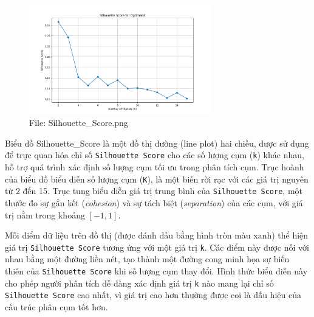 \documentclass[12pt]{report}
\begin{document}
{\\
\begin{figure}[h]
    \centering
    \includegraphics[width=300px]{Silhouette_Score.png}
    \caption{File: Silhouette\_Score.png}
    \label{fig:Silhouette}
\end{figure}
Biểu đồ Silhouette\_Score là một đồ thị đường (line plot) hai chiều, được sử dụng để trực quan hóa chỉ số \texttt{Silhouette Score} cho các số lượng cụm (\texttt{k}) khác nhau, hỗ trợ quá trình xác định số lượng cụm tối ưu trong phân tích cụm. Trục hoành của biểu đồ biểu diễn số lượng cụm (\texttt{K}), là một biến rời rạc với các giá trị nguyên từ 2 đến 15. Trục tung biểu diễn giá trị trung bình của \texttt{Silhouette Score}, một thước đo sự gắn kết (\textit{cohesion}) và sự tách biệt (\textit{separation}) của các cụm, với giá trị nằm trong khoảng \([-1, 1]\).

Mỗi điểm dữ liệu trên đồ thị (được đánh dấu bằng hình tròn màu xanh) thể hiện giá trị \texttt{Silhouette Score} tương ứng với một giá trị \texttt{k}. Các điểm này được nối với nhau bằng một đường liền nét, tạo thành một đường cong minh họa sự biến thiên của \texttt{Silhouette Score} khi số lượng cụm thay đổi. Hình thức biểu diễn này cho phép người phân tích dễ dàng xác định giá trị \texttt{k} nào mang lại chỉ số \texttt{Silhouette Score} cao nhất, vì giá trị cao hơn thường được coi là dấu hiệu của cấu trúc phân cụm tốt hơn.

}
\end{document}
